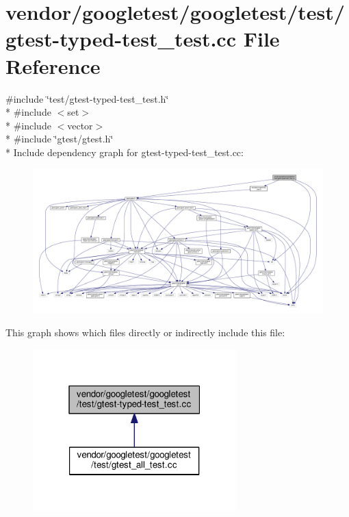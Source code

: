 \hypertarget{gtest-typed-test__test_8cc}{}\section{vendor/googletest/googletest/test/gtest-\/typed-\/test\+\_\+test.cc File Reference}
\label{gtest-typed-test__test_8cc}
{\ttfamily \#include \char`\"{}test/gtest-\/typed-\/test\+\_\+test.\+h\char`\"{}}\\*
{\ttfamily \#include $<$set$>$}\\*
{\ttfamily \#include $<$vector$>$}\\*
{\ttfamily \#include \char`\"{}gtest/gtest.\+h\char`\"{}}\\*
Include dependency graph for gtest-\/typed-\/test\+\_\+test.cc\+:
\nopagebreak
\begin{figure}[H]
\begin{center}
\leavevmode
\includegraphics[width=350pt]{gtest-typed-test__test_8cc__incl}
\end{center}
\end{figure}
This graph shows which files directly or indirectly include this file\+:
\nopagebreak
\begin{figure}[H]
\begin{center}
\leavevmode
\includegraphics[width=223pt]{gtest-typed-test__test_8cc__dep__incl}
\end{center}
\end{figure}
